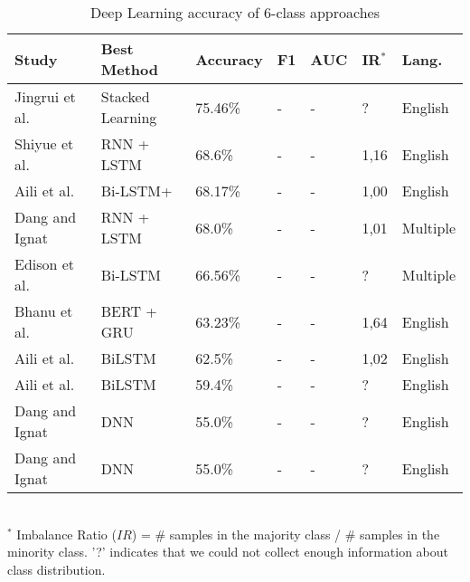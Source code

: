 \begin{table}[ht]
    \caption{Deep Learning accuracy of 6-class approaches }
    \label{tab:DL_performance_6class}
    \centering
    \begin{tabular}{l l l l l l l}
        \toprule
        \textbf{Study} & \textbf{Best Method} & \textbf{Accuracy} & \textbf{F1} & \textbf{AUC} & \textbf{IR$^*$} & \textbf{Lang.} \\ 
        \midrule
        Jingrui et al.~\cite{Hou2021_lr122} & Stacked Learning & 75.46\% & - & - & ? & English \\
        Shiyue et al.~\cite{Zhang2018_lr41} & RNN + LSTM & 68.6\% & - & - & 1,16 & English \\
        Aili et al.~\cite{Shen2017_lr31} & Bi-LSTM+ & 68.17\% & - & - & 1,00 & English \\
        Dang and Ignat~\cite{Dang2017_lr23} & RNN + LSTM & 68.0\% & - & - & 1,01 & Multiple \\
        Edison et al.~\cite{Marrese-Taylor2019_lr85} & Bi-LSTM & 66.56\% & - & - & ? & Multiple \\
        Bhanu et al.~\cite{Guda2020_lr38} & BERT + GRU & 63.23\% & - & - & 1,64 & English \\
        Aili et al.~\cite{Shen2020_lr2009} & BiLSTM & 62.5\% & - & - & 1,02 & English \\
        Aili et al.~\cite{Shen2019_lr1061} & BiLSTM & 59.4\% & - & - & ? & English \\
        Dang and Ignat~\cite{Dang2016_lr24} & DNN & 55.0\% & - & - & ? & English \\
        Dang and Ignat~\cite{Dang2016_lr89} & DNN & 55.0\% & - & - & ? & English \\
        \bottomrule
    \end{tabular}
    \\ \vspace{0.1cm}
    \footnotesize
    $^*$ Imbalance Ratio ($IR$) = \# samples in the majority class / \# samples in the minority class. '?' indicates that we could not collect enough information about class distribution.
\end{table}